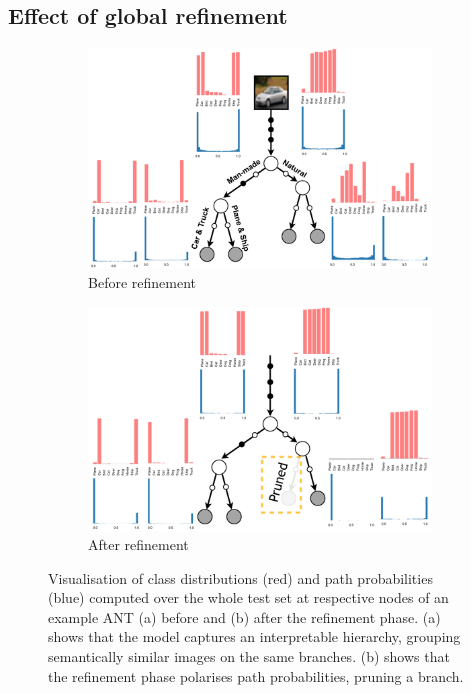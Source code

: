 \subsection{Effect of global refinement} \label{sec:refinement}
\begin{figure}[t!]
	\center
	\begin{subfigure}[t]{0.9\linewidth}
		\includegraphics[width=\linewidth]{chapter_7/figures/fig_7_9.png}
		\vspace{-6mm}
		\caption{Before refinement}
	\end{subfigure}
	\hspace{4.66mm}
	\begin{subfigure}[t]{0.9\linewidth}
		\includegraphics[width=\linewidth]{chapter_7/figures/fig_7_10.png}
		\vspace{-6mm}
		\caption{After refinement}
	\end{subfigure}
	\caption{\footnotesize Visualisation of class distributions (red) and path probabilities (blue) computed over the whole test set at respective nodes of an example ANT (a) before and (b) after the refinement phase. (a) shows that the model captures an interpretable hierarchy, grouping semantically similar images on the same branches. (b) shows that the refinement phase polarises path probabilities, pruning a branch.}
	\label{fig:learnedmodel}
\end{figure}

